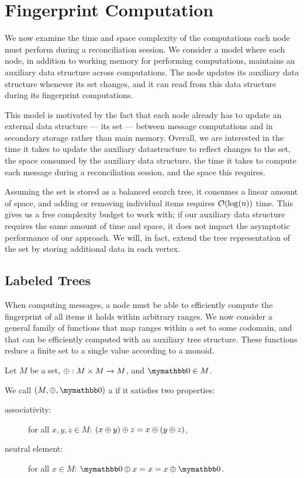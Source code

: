 \documentclass[conference]{IEEEtran}
\begin{document}
\section{Fingerprint Computation}\label{sec:computation}

We now examine the time and space complexity of the computations each node must perform during a reconciliation session. We consider a model where each node, in addition to working memory for performing computations, maintains an auxiliary data structure across computations. The node updates its auxiliary data structure whenever its set changes, and it can read from this data structure during its fingerprint computations.

This model is motivated by the fact that each node already has to update an external data structure --- its set  --- between message computations and in secondary storage rather than main memory. Overall, we are interested in the time it takes to update the auxiliary datastructure to reflect changes to the set, the space consumed by the auxiliary data structure, the time it takes to compute each message during a reconciliation session, and the space this requires.

Assuming the set is stored as a balanced search tree, it consumes a linear amount of space, and adding or removing individual items requires $\mathcal{O}(\log(n))$ time. This gives us a free complexity budget to work with; if our auxiliary data structure requires the same amount of time and space, it does not impact the asymptotic performance of our approach. We will, in fact, extend the tree representation of the set by storing additional data in each vertex.

\subsection{Labeled Trees}

When computing messages, a node must be able to efficiently compute the fingerprint of all items it holds within arbitrary ranges. We now consider a general family of functions that map ranges within a set to some codomain, and that can be efficiently computed with an auxiliary tree structure. These functions reduce a finite set to a single value according to a monoid.

\begin{definition}[Monoid]
Let $M$ be a set, $\oplus: M \times M \rightarrow M$, and $\neutraladd \in M$.

We call $(M, \groupaddsym, \neutraladd)$ a  if it satisfies two properties:

  \begin{description}
    \item[associativity:] for all $x, y, z \in M$: ${({x} \oplus {y})} \oplus {z} = {x} \oplus {({y} \oplus{z})}$,
    \item[neutral element:] for all $x \in M$: $\groupadd{\neutraladd}{x} = x = \groupadd{x}{\neutraladd}$.
  \end{description}
\end{definition}
\end{document}
